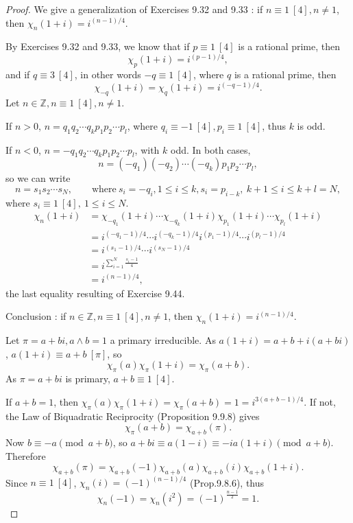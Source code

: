 \documentclass[11pt,a4paper]{article}
\begin{document}
\begin{proof}
We give a generalization of Exercises 9.32 and 9.33 : if $n\equiv1\ [4], n \neq 1$, then $\chi_n(1+i) = i^{(n-1)/4}$.

By Exercises 9.32 and 9.33, we know that if  $p\equiv 1\ [4]$ is a rational prime, then 
$$\chi_p(1+i) = i^{(p-1)/4},$$
and if $q \equiv 3 \ [4]$, in other words $-q \equiv 1 \ [4]$, where $q$ is a rational prime, then
$$\chi_{-q}(1+i) =  \chi_{q}(1+i) = i^{(-q-1)/4}.$$
Let  $n \in \mathbb{Z}, n\equiv 1 \ [4],n\neq 1$.

If $n>0$, $n = q_1q_2\cdots q_kp_1p_2\cdots p_l$, where $q_i \equiv -1 \ [4], p_i \equiv 1 \ [4]$, thus $k$ is odd.

If $n<0$, $n = -q_1q_2\cdots q_kp_1p_2\cdots p_l$, with $k$ odd.
In both cases, 
$$n = (-q_1)(-q_2)\cdots(-q_k)p_1p_2\cdots p_l,$$
so we can write
$$n = s_1s_2\cdots s_N, \qquad \mathrm{where}\ s_i = -q_i, 1\leq i \leq k, s_i = p_{i-k}, \ k+1 \leq i \leq k+l = N,$$
where $s_i\equiv 1 \ [4], \ 1 \leq i \leq N$.
\begin{align*}
\chi_n(1+i)&=  \chi_{-q_1}(1+i)\cdots\chi_{-q_k}(1+i)\chi_{p_1}(1+i)\cdots\chi_{p_l}(1+i)\\
&=i^{(-q_1-1)/4}\cdots i^{(-q_k-1)/4}  i^{(p_1-1)/4} \cdots i^{(p_l-1)/4} \\
&=i^{(s_1-1)/4}\cdots  i^{(s_N-1)/4} \\
&=i^{\sum_{i=1}^N \frac{s_i-1}{4}}\\
&=i^{(n-1)/4},
\end{align*}
the last equality resulting of Exercise 9.44.

Conclusion : if $n \in \mathbb{Z}, n\equiv1\ [4], n \neq 1$, then $\chi_n(1+i)=i^{(n-1)/4}$.

\bigskip

Let $\pi = a+bi, a\wedge b=1$ a primary irreducible. As $a(1+i) = a+b + i(a+bi)$, $a(1+i) \equiv a+b \ [\pi]$, so
$$\chi_{\pi}(a) \chi_{\pi}(1+i) = \chi_{\pi}(a+b).$$
As $\pi =a +bi$ is primary, $a+b \equiv 1 \ [4]$.

If $a+b = 1$, then $\chi_{\pi}(a) \chi_{\pi}(1+i) = \chi_{\pi}(a+b)=1 = i^{3(a+b-1)/4}$. If not, the Law of Biquadratic Reciprocity (Proposition 9.9.8) gives
$$\chi_\pi(a+b) = \chi_{a+b}(\pi).$$
Now $b \equiv -a\pmod{a+b}$, so $ a + bi \equiv a(1-i) \equiv -i a (1+i) \pmod{a+b}$. Therefore
$$\chi_{a+b}(\pi) = \chi_{a+b}(-1) \chi_{a+b}(a) \chi_{a+b}(i) \chi_{a+b}(1+i).$$
Since $n\equiv 1 \ [4]$, $\chi_n(i) = (-1)^{(n-1)/4}$ (Prop.9.8.6), thus $$\chi_n(-1) = \chi_n(i^2) = (-1)^{\frac{n-1}{2}}=1.$$


\end{proof}
\end{document}

